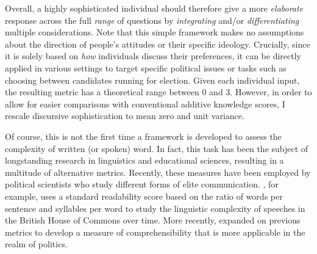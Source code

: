 Overall, a highly sophisticated individual should therefore give a more \textit{elaborate} response across the full \textit{range} of questions by \textit{integrating} and/or \textit{differentiating} multiple considerations. Note that this simple framework makes no assumptions about the direction of people's attitudes or their specific ideology. Crucially, since it is solely based on \textit{how} individuals discuss their preferences, it can be directly applied in various settings to target specific political issues or tasks such as choosing between candidates running for election. Given each individual input, the resulting metric has a theoretical range between 0 and 3. However, in order to allow for easier comparisons with conventional additive knowledge scores, I rescale discursive sophistication to mean zero and unit variance.

Of course, this is not the first time a framework is developed to assess the complexity of written (or spoken) word. In fact, this task has been the subject of longstanding research in linguistics and educational sciences, resulting in a multitude of alternative metrics. Recently, these measures have been employed by political scientists who study different forms of elite communication. \citet{spirling2016democratization}, for example, uses a standard readability score based on the ratio of words per sentence and syllables per word to study the linguistic complexity of speeches in the British House of Commons over time. More recently, \citet{benoit2019measuring} expanded on previous metrics to develop a measure of comprehensibility that is more applicable in the realm of politics.


